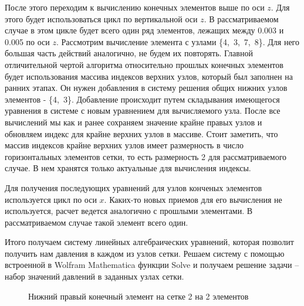 \documentclass[12pt, a4paper]{article}
\begin{document}
После этого переходим к вычислению конечных элементов выше по оси $z$.  Для этого будет использоваться цикл по вертикальной оси $z$. В рассматриваемом случае в этом цикле будет всего один ряд элементов, лежащих между 0.003 и 0.005 по оси $z$.
Рассмотрим вычисление элемента с узлами \{4,~3,~7,~8\}. Для него большая часть действий аналогично, не будем их повторять. Главной отличительной чертой алгоритма относительно прошлых конечных элементов будет использования массива индексов верхних узлов, который был заполнен на ранних этапах. Он нужен добавления в систему решения общих нижних узлов элементов - \{4,~3\}. Добавление происходит путем складывания имеющегося уравнения в системе с новым уравнением для вычисляемого узла. После все вычислений мы как и ранее сохраняем значение крайне правых узлов и обновляем индекс для крайне верхних узлов в массиве. Стоит заметить, что массив индексов крайне верхних узлов имеет размерность в число горизонтальных элементов сетки, то есть размерность 2 для рассматриваемого случае. В нем хранятся только актуальные для вычисления индексы.

Для получения последующих уравнений для узлов конченых элементов используется цикл по оси $x$. Каких-то новых приемов для его вычисления не используется, расчет ведется аналогично с прошлыми элементами. В рассматриваемом случае такой элемент всего один.

Итого получаем систему линейных алгебраических уравнений, которая позволит получить нам давления в каждом из узлов сетки. Решаем систему с помощью встроенной в Wolfram Mathematica функции Solve и получаем решение задачи -- набор значений давлений в заданных узлах сетки.
\begin{figure}[!htbp]
	\caption{Нижний правый конечный элемент на сетке 2 на 2 элементов}
	\label{right-bottom-el}
\end{figure}
\end{document}
